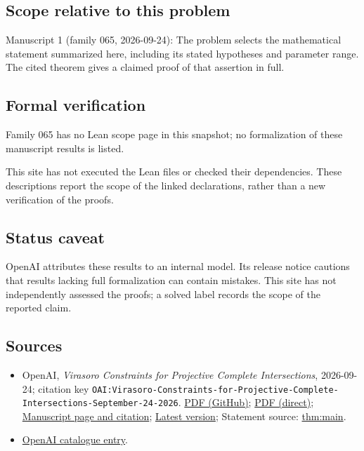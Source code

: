 \documentclass[11pt]{article}
\begin{document}
\subsection{Scope relative to this problem}
Manuscript 1 (family 065, 2026-09-24): The problem selects the mathematical statement summarized here, including its stated hypotheses and parameter range. The cited theorem gives a claimed proof of that assertion in full.

\subsection{Formal verification}
Family 065 has no Lean scope page in this snapshot; no formalization of these manuscript results is listed.

This site has not executed the Lean files or checked their dependencies. These descriptions report the scope of the linked declarations, rather than a new verification of the proofs.

\subsection{Status caveat}
OpenAI attributes these results to an internal model. Its release notice cautions that results lacking full formalization can contain mistakes. This site has not independently assessed the proofs; a solved label records the scope of the reported claim.

\subsection{Sources}
\begin{itemize}
\item OpenAI, \emph{Virasoro Constraints for Projective Complete Intersections}, 2026-09-24; citation key \texttt{OAI:Virasoro-Constraints-for-Projective-Complete-Intersections-September-24-2026}. \href{https://github.com/openai/math/blob/adc7f1241b42e322a6451854ab7e4b4c146bf78a/preprints/Virasoro-Constraints-for-Projective-Complete-Intersections-September-24-2026/article.pdf}{PDF (GitHub)}; \href{https://github.com/openai/math/raw/adc7f1241b42e322a6451854ab7e4b4c146bf78a/preprints/Virasoro-Constraints-for-Projective-Complete-Intersections-September-24-2026/article.pdf}{PDF (direct)}; \href{https://github.com/openai/math/blob/adc7f1241b42e322a6451854ab7e4b4c146bf78a/preprints/Virasoro-Constraints-for-Projective-Complete-Intersections-September-24-2026/README.md}{Manuscript page and citation}; \href{https://github.com/openai/math/blob/main/preprints/Virasoro-Constraints-for-Projective-Complete-Intersections-September-24-2026/article.pdf}{Latest version}; Statement source: \href{https://github.com/openai/math/blob/adc7f1241b42e322a6451854ab7e4b4c146bf78a/preprints/Virasoro-Constraints-for-Projective-Complete-Intersections-September-24-2026/build/sections/introduction.tex\#L15}{thm:main}.
\item \href{https://github.com/openai/math/blob/adc7f1241b42e322a6451854ab7e4b4c146bf78a/CONTENTS.md}{OpenAI catalogue entry}.
\end{itemize}
\end{document}
